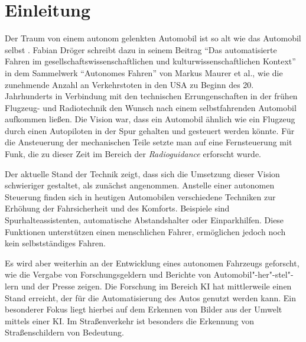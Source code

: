\chapter{Einleitung}
\label{cha:Einleitung}
\setlength{\epigraphwidth}{4in}

Der Traum von einem autonom gelenkten Automobil ist so alt wie das Automobil selbst \cite{maurer_autonomes_2015}. Fabian Dröger schreibt dazu in seinem Beitrag "`Das automatisierte Fahren im gesellschaftswissenschaftlichen und kulturwissenschaftlichen Kontext"' in dem Sammelwerk "`Autonomes Fahren"' von Markus Maurer et al., wie die zunehmende Anzahl an Verkehrstoten in den USA zu Beginn des 20. Jahrhunderts in Verbindung mit den technischen Errungenschaften in der frühen Flugzeug- und Radiotechnik den Wunsch nach einem selbstfahrenden Automobil aufkommen ließen. Die Vision war, dass ein Automobil ähnlich wie ein Flugzeug durch einen Autopiloten in der Spur gehalten und gesteuert werden könnte. Für die Ansteuerung der mechanischen Teile setzte man auf eine Fernsteuerung mit Funk, die zu dieser Zeit im Bereich der \emph{Radioguidance} erforscht wurde.

Der aktuelle Stand der Technik zeigt, dass sich die Umsetzung dieser Vision schwieriger gestaltet, als zunächst angenommen. Anstelle einer autonomen Steuerung finden sich in heutigen Automobilen verschiedene Techniken zur Erhöhung der Fahrsicherheit und des Komforts. Beispiele sind Spurhalteassistenten, automatische Abstandshalter oder Einparkhilfen. Diese Funktionen unterstützen einen menschlichen Fahrer, ermöglichen jedoch noch kein selbstständiges Fahren.

Es wird aber weiterhin an der Entwicklung eines autonomen Fahrzeugs geforscht, wie die Vergabe von Forschungsgeldern\cite{bmbf-internetredaktion_auto_nodate} und Berichte von Automobil"-her"-stel"-lern\cite{bmw_autonomes_nodate} und der Presse\cite{efler_autonomes_2018} zeigen. Die Forschung im Bereich \ac{KI} hat mittlerweile einen Stand erreicht, der für die Automatisierung des Autos genutzt werden kann. Ein besonderer Fokus liegt hierbei auf dem Erkennen von Bilder aus der Umwelt mittels einer \ac{KI}. Im Straßenverkehr ist besonders die Erkennung von Straßenschildern von Bedeutung. 


